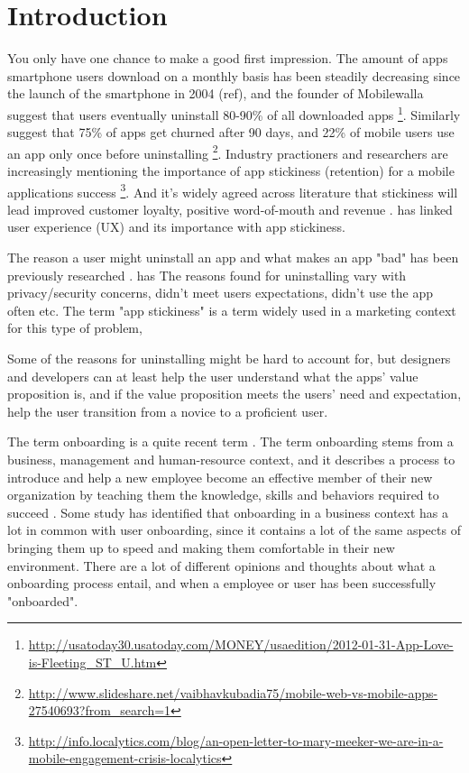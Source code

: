 \chapter{Introduction}
\label{chap:introduction}

You only have one chance to make a good first impression. The amount of apps smartphone users download on a monthly basis has been steadily decreasing since the launch of the smartphone in 2004 (ref), and the founder of Mobilewalla suggest that users eventually uninstall 80-90\% of all downloaded apps \footnote{\url{http://usatoday30.usatoday.com/MONEY/usaedition/2012-01-31-App-Love-is-Fleeting\_ST\_U.htm}}. Similarly \cite{Perro2016} suggest that 75\% of apps get churned after 90 days, and 22\% of mobile users use an app only once before uninstalling \footnote{\url{http://www.slideshare.net/vaibhavkubadia75/mobile-web-vs-mobile-apps-27540693?from_search=1}}. Industry practioners and researchers are increasingly mentioning the importance of app stickiness (retention) for a mobile applications success \cite{Perro2016} \cite{IGIGlobal2016} \cite{Kim2016} \footnote{\url{http://info.localytics.com/blog/an-open-letter-to-mary-meeker-we-are-in-a-mobile-engagement-crisis-localytics}}. And it's widely agreed across literature that stickiness will lead improved customer loyalty, positive word-of-mouth and revenue \cite{Reichheld2000} \cite{Srinivasan2002} \cite{Hsu2016a}. \cite{IGIGlobal2016} has linked user experience (UX) and its importance with app stickiness.

The reason a user might uninstall an app and what makes an app "bad" has been previously researched \cite{Lin2012} \cite{Shklovski} \cite{Song2014}. \cite{IGIGlobal2016} has  The reasons found for uninstalling vary with privacy/security concerns, didn't meet users expectations, didn't use the app often etc. The term "app stickiness" is a term widely used in a marketing context for this type of problem,

Some of the reasons for uninstalling might be hard to account for, but designers and developers can at least help the user understand what the apps' value proposition is, and if the value proposition meets the users' need and expectation, help the user transition from a novice to a proficient user.

The term onboarding is a quite recent term \cite{Dai2007}. The term onboarding stems from a business, management and human-resource context, and it describes a process to introduce and help a new employee become an effective member of their new organization by teaching them the knowledge, skills and behaviors required to succeed \cite{Bauer2011}. Some study has identified that onboarding in a business context has a lot in common with user onboarding, since it contains a lot of the same aspects of bringing them up to speed and making them comfortable in their new environment. There are a lot of different opinions and thoughts about what a onboarding process entail, and when a employee or user has been successfully "onboarded".

